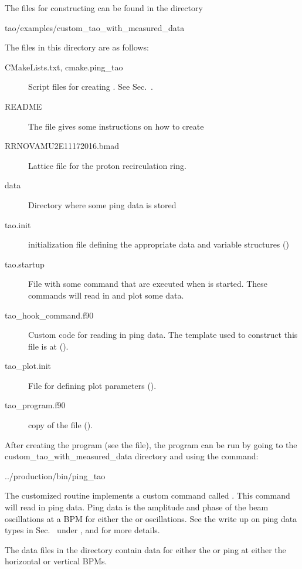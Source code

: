 {{{{The files for constructing  can be found
in the directory
\begin{example}
  tao/examples/custom_tao_with_measured_data
\end{example}
The files in this directory are as follows:
\begin{description}
  \item[CMakeLists.txt, cmake.ping_tao] \Newline
Script files for creating . See Sec.~.
  \item[README] \Newline
The  file gives some instructions on how to create 
  \item[RRNOVAMU2E11172016.bmad] \Newline
Lattice file for the proton recirculation ring.
  \item[data] \Newline
Directory where some ping data is stored
  \item[tao.init] \Newline
\tao initialization file defining the appropriate data and variable structures ()
  \item[tao.startup] \Newline
File with some command that are executed when \tao is started. These commands will read in
and plot some data.
  \item[tao_hook_command.f90] \Newline
Custom code for reading in ping data. The template used to construct this file is at
 ().
  \item[tao_plot.init] \Newline
File for defining plot parameters ().
  \item[tao_program.f90] \Newline
copy of the  file ().
\end{description}

After creating the  program (see the  file), the program can
be run by going to the custom_tao_with_measured_data directory and using the command:
\begin{example}
	../production/bin/ping_tao
\end{example}

The customized  routine implements a custom command called
.  This command will read in ping data. Ping data is the amplitude and phase
of the beam oscillations at a BPM for either the  or  oscillations.
See the write up on ping data types in Sec.~ under ,
and  for more details.

The data files in the  directory contain data for either the  or  ping at either
the horizontal or vertical BPMs.

}}}}
